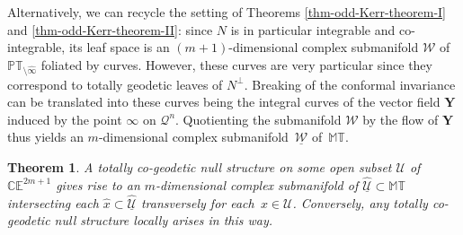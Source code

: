 \documentclass[pdftex]{sigma}
\numberwithin{equation}{section}
\newtheorem{Theorem}{Theorem}[section]
\newcommand{\mc} [1]{\mathcal{#1}}
\newcommand{\PT} {\mathbb{PT}}
\newcommand{\T} {\mathbb{T}}
\newcommand{\E} {\mathbb{E}}
\newcommand{\M} {\mathbb{M}}
\newcommand{\C} {\mathbb{C}}
\begin{document}
 Alternatively, we can recycle the setting of Theorems \ref{thm-odd-Kerr-theorem-I} and \ref{thm-odd-Kerr-theorem-II}: since $N$ is in particular integrable and co-integrable, its leaf space is an $(m+1)$-dimensional complex submanifold $\mc{W}$ of $\PT_{\setminus \widehat{\infty}}$ foliated by curves. However, these curves are very particular since they correspond to totally geodetic leaves of $N^\perp$. Breaking of the conformal invariance can be translated into these curves being the integral curves of the vector f\/ield $\bm{Y}$ induced by the point $\infty$ on $\mc{Q}^n$. Quotienting the submanifold $\mc{W}$ by the f\/low of $\bm{Y}$ thus yields an $m$-dimensional complex submanifold~$\underline{\mc{W}}$ of~$\M\T$.

\begin{Theorem}\label{thm-odd-Kerr-theorem-NC}
A totally co-geodetic null structure on some open subset $\mc{U}$ of $\C \E^{2m+1}$ gives rise to an $m$-dimensional complex submanifold of $\underline{\widehat{\mc{U}}} \subset \M\T$ intersecting each $\hat{x} \subset \underline{\widehat{\mc{U}}}$ transversely for each~$x \in \mc{U}$. Conversely, any totally co-geodetic null structure locally arises in this way.
\end{Theorem}
\end{document}
